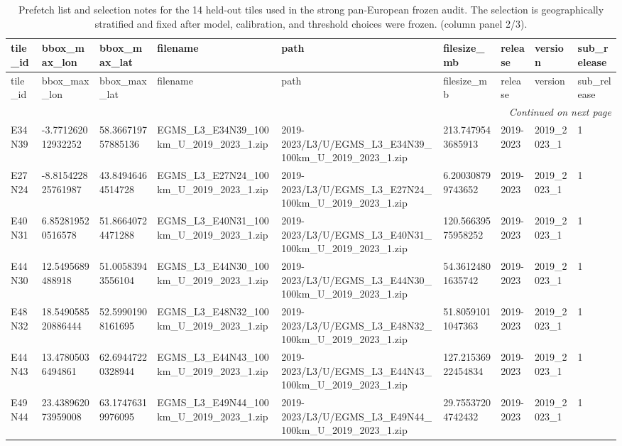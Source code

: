 \begin{landscape}
\scriptsize
\setlength{\LTleft}{0pt}
\setlength{\LTright}{0pt}
\begin{longtable}{lllllllll}
\caption{Prefetch list and selection notes for the 14 held-out tiles used in the strong pan-European frozen audit. The selection is geographically stratified and fixed after model, calibration, and threshold choices were frozen. (column panel 2/3).}\label{tab:e7_strong_selected_tiles_part2}\\
\toprule
tile\_id & bbox\_max\_lon & bbox\_max\_lat & filename & path & filesize\_mb & release & version & sub\_release \\
\midrule
\endfirsthead
\toprule
tile\_id & bbox\_max\_lon & bbox\_max\_lat & filename & path & filesize\_mb & release & version & sub\_release \\
\midrule
\endhead
\midrule
\multicolumn{9}{r}{\textit{Continued on next page}} \\
\endfoot
\bottomrule
\endlastfoot
E34N39 & -3.771262012932252 & 58.366719757885136 & EGMS\_L3\_E34N39\_100km\_U\_2019\_2023\_1.zip & 2019-2023/L3/U/EGMS\_L3\_E34N39\_100km\_U\_2019\_2023\_1.zip & 213.7479543685913 & 2019-2023 & 2019\_2023\_1 & 1 \\
E27N24 & -8.815422825761987 & 43.84946464514728 & EGMS\_L3\_E27N24\_100km\_U\_2019\_2023\_1.zip & 2019-2023/L3/U/EGMS\_L3\_E27N24\_100km\_U\_2019\_2023\_1.zip & 6.200308799743652 & 2019-2023 & 2019\_2023\_1 & 1 \\
E40N31 & 6.852819520516578 & 51.86640724471288 & EGMS\_L3\_E40N31\_100km\_U\_2019\_2023\_1.zip & 2019-2023/L3/U/EGMS\_L3\_E40N31\_100km\_U\_2019\_2023\_1.zip & 120.56639575958252 & 2019-2023 & 2019\_2023\_1 & 1 \\
E44N30 & 12.5495689488918 & 51.00583943556104 & EGMS\_L3\_E44N30\_100km\_U\_2019\_2023\_1.zip & 2019-2023/L3/U/EGMS\_L3\_E44N30\_100km\_U\_2019\_2023\_1.zip & 54.36124801635742 & 2019-2023 & 2019\_2023\_1 & 1 \\
E48N32 & 18.549058520886444 & 52.59901908161695 & EGMS\_L3\_E48N32\_100km\_U\_2019\_2023\_1.zip & 2019-2023/L3/U/EGMS\_L3\_E48N32\_100km\_U\_2019\_2023\_1.zip & 51.80591011047363 & 2019-2023 & 2019\_2023\_1 & 1 \\
E44N43 & 13.47805036494861 & 62.69447220328944 & EGMS\_L3\_E44N43\_100km\_U\_2019\_2023\_1.zip & 2019-2023/L3/U/EGMS\_L3\_E44N43\_100km\_U\_2019\_2023\_1.zip & 127.21536922454834 & 2019-2023 & 2019\_2023\_1 & 1 \\
E49N44 & 23.438962073959008 & 63.17476319976095 & EGMS\_L3\_E49N44\_100km\_U\_2019\_2023\_1.zip & 2019-2023/L3/U/EGMS\_L3\_E49N44\_100km\_U\_2019\_2023\_1.zip & 29.75537204742432 & 2019-2023 & 2019\_2023\_1 & 1 \\

\end{longtable}
\end{landscape}
